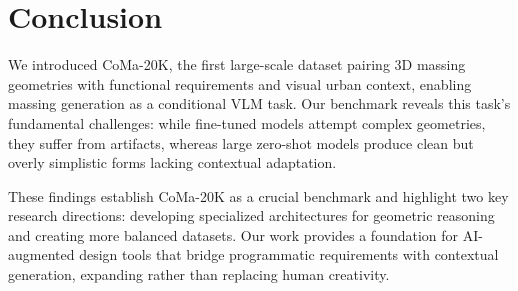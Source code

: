 \section{Conclusion}

We introduced CoMa-20K, the first large-scale dataset pairing 3D massing geometries with functional requirements and visual urban context, enabling massing generation as a conditional VLM task. Our benchmark reveals this task's fundamental challenges: while fine-tuned models attempt complex geometries, they suffer from artifacts, whereas large zero-shot models produce clean but overly simplistic forms lacking contextual adaptation.

These findings establish CoMa-20K as a crucial benchmark and highlight two key research directions: developing specialized architectures for geometric reasoning and creating more balanced datasets. Our work provides a foundation for AI-augmented design tools that bridge programmatic requirements with contextual generation, expanding rather than replacing human creativity.